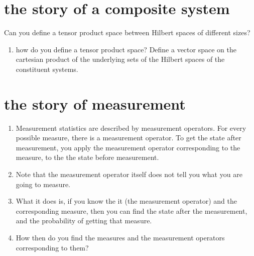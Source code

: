 \documentclass[a4paper,12pt]{amsbook}
\newcommand{\0}{{$|0\rangle$}}
\newcommand{\1}{{$|1\rangle$}}
\begin{document}
\section{the story of a composite system}
Can you define a tensor product space between Hilbert spaces of different sizes?
\begin{enumerate}
    \item how do you define a tensor product space? Define a vector space on the cartesian product of the underlying sets of the Hilbert spaces of the constituent systems.
\end{enumerate}
\section{the story of measurement}
\begin{enumerate}
    \item Measurement statistics are described by measurement operators. For every possible measure, there is a measurement operator. To get the state after measurement, you apply the measurement operator corresponding to the measure, to the the state before measurement. 
    \item Note that the measurement operator itself does not tell you what you are going to measure. 
    \item What it does is, if you know the it (the measurement operator) and the corresponding measure, then you can find the state after the measurement, and the probability of getting that measure.
    \item How then do you find the measures and the measurement operators corresponding to them?
\end{enumerate}
\end{document}
